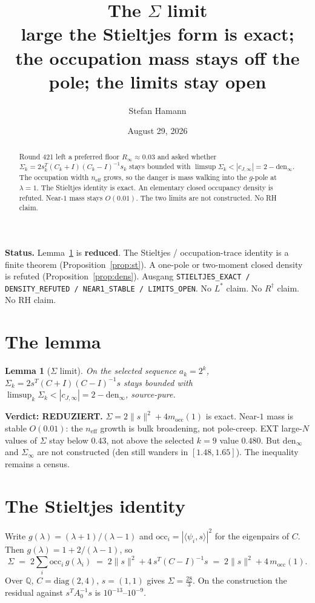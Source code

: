 \documentclass[11pt]{article}
\title{\bfseries The $\Sigma$ limit\\[2mm]
large the Stieltjes form is exact; the occupation
mass stays off the pole; the limits stay open}
\author{Stefan Hamann}
\date{August 29, 2026}
\newtheorem{lemma}{Lemma}
\theoremstyle{remark}
\begin{document}
\maketitle

\begin{abstract}\noindent
Round 421 left a preferred floor $R_\infty\approx 0.03$
and asked whether
$\Sigma_k=2s_k^{T}(C_k+I)(C_k-I)^{-1}s_k$ stays
bounded with $\limsup\Sigma_k<|c_{J,\infty}|=2-\mathrm{den}_\infty$.
The occupation width $n_{\mathrm{eff}}$ grows, so the
danger is mass walking into the $g$-pole at
$\lambda=1$.
The Stieltjes identity is exact.
An elementary closed occupancy density is refuted.
Near-$1$ mass stays $O(0.01)$.
The two limits are not constructed.
No RH claim.
\end{abstract}

\medskip\noindent
\textbf{Status.}\enspace
Lemma~\ref{lem:sig} is \textbf{reduced}.
The Stieltjes / occupation-trace identity is a
finite theorem (Proposition~\ref{prop:st}).
A one-pole or two-moment closed density is
refuted (Proposition~\ref{prop:dens}).
Ausgang \texttt{STIELTJES\_EXACT / DENSITY\_REFUTED / NEAR1\_STABLE / LIMITS\_OPEN}.
No $L^{*}$ claim.  No $R^{\dagger}$ claim.  No RH claim.

\section{The lemma}\label{sec:lem}

\begin{lemma}[$\Sigma$ limit]\label{lem:sig}
On the selected sequence $a_k=2^k$,
$\Sigma_k=2s^{T}(C+I)(C-I)^{-1}s$ stays bounded
with
$\limsup_k\Sigma_k<|c_{J,\infty}|=2-\mathrm{den}_\infty$,
source-pure.
\end{lemma}

\noindent
\textbf{Verdict: REDUZIERT.}
$\Sigma=2\|s\|^{2}+4m_{\mathrm{occ}}(1)$ is exact.
Near-$1$ mass is stable $O(0.01)$: the
$n_{\mathrm{eff}}$ growth is bulk broadening, not
pole-creep.
EXT large-$N$ values of $\Sigma$ stay below $0.43$,
not above the selected $k=9$ value $0.480$.
But $\mathrm{den}_\infty$ and $\Sigma_\infty$ are
not constructed ($\mathrm{den}$ still wanders in
$[1.48,1.65]$).
The inequality remains a census.

\section{The Stieltjes identity}\label{sec:st}

Write $g(\lambda)=(\lambda+1)/(\lambda-1)$ and
$\mathrm{occ}_i=|\langle\psi_i,s\rangle|^{2}$ for
the eigenpairs of $C$.
Then $g(\lambda)=1+2/(\lambda-1)$, so
\begin{equation}\label{eq:st}
\Sigma
\;=\;
2\sum_i\mathrm{occ}_i\,g(\lambda_i)
\;=\;
2\|s\|^{2}+4\,s^{T}(C-I)^{-1}s
\;=\;
2\|s\|^{2}+4\,m_{\mathrm{occ}}(1).
\end{equation}
Over $\mathbb{Q}$, $C=\mathrm{diag}(2,4)$,
$s=(1,1)$ gives $\Sigma=\tfrac{28}{3}$.
On the construction the residual against
$s^{T}A_{0}^{-1}s$ is $10^{-13}$--$10^{-9}$.
\end{document}
